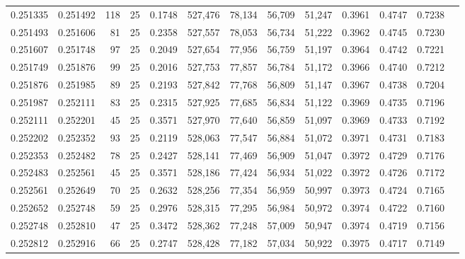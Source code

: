 \begin{tabular}{rrrrrrrrrrrrr}
0.251335 & 0.251492 &   118 &  25 &                                     0.1748 & 527,476 &  78,134 &  56,709 &  51,247 & 0.3961 & 0.4747 & 0.7238 \\
0.251493 & 0.251606 &    81 &  25 &                                     0.2358 & 527,557 &  78,053 &  56,734 &  51,222 & 0.3962 & 0.4745 & 0.7230 \\
0.251607 & 0.251748 &    97 &  25 &                                     0.2049 & 527,654 &  77,956 &  56,759 &  51,197 & 0.3964 & 0.4742 & 0.7221 \\
0.251749 & 0.251876 &    99 &  25 &                                     0.2016 & 527,753 &  77,857 &  56,784 &  51,172 & 0.3966 & 0.4740 & 0.7212 \\
0.251876 & 0.251985 &    89 &  25 &                                     0.2193 & 527,842 &  77,768 &  56,809 &  51,147 & 0.3967 & 0.4738 & 0.7204 \\
0.251987 & 0.252111 &    83 &  25 &                                     0.2315 & 527,925 &  77,685 &  56,834 &  51,122 & 0.3969 & 0.4735 & 0.7196 \\
0.252111 & 0.252201 &    45 &  25 &                                     0.3571 & 527,970 &  77,640 &  56,859 &  51,097 & 0.3969 & 0.4733 & 0.7192 \\
0.252202 & 0.252352 &    93 &  25 &                                     0.2119 & 528,063 &  77,547 &  56,884 &  51,072 & 0.3971 & 0.4731 & 0.7183 \\
0.252353 & 0.252482 &    78 &  25 &                                     0.2427 & 528,141 &  77,469 &  56,909 &  51,047 & 0.3972 & 0.4729 & 0.7176 \\
0.252483 & 0.252561 &    45 &  25 &                                     0.3571 & 528,186 &  77,424 &  56,934 &  51,022 & 0.3972 & 0.4726 & 0.7172 \\
0.252561 & 0.252649 &    70 &  25 &                                     0.2632 & 528,256 &  77,354 &  56,959 &  50,997 & 0.3973 & 0.4724 & 0.7165 \\
0.252652 & 0.252748 &    59 &  25 &                                     0.2976 & 528,315 &  77,295 &  56,984 &  50,972 & 0.3974 & 0.4722 & 0.7160 \\
0.252748 & 0.252810 &    47 &  25 &                                     0.3472 & 528,362 &  77,248 &  57,009 &  50,947 & 0.3974 & 0.4719 & 0.7156 \\
0.252812 & 0.252916 &    66 &  25 &                                     0.2747 & 528,428 &  77,182 &  57,034 &  50,922 & 0.3975 & 0.4717 & 0.7149 \\

\end{tabular}
